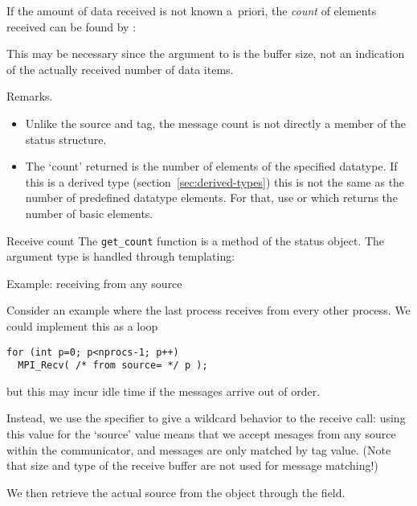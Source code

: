 If the amount of data received is not known a~priori, the
\emph{count} of elements received
can be found by 
:
%
%

This may be necessary since the  argument to  is 
the buffer size, not an indication of the actually received number of
data items.

Remarks.
\begin{itemize}
\item Unlike the source and tag, the message count is not directly a member of the status
  structure.
\item The `count' returned is the number of elements of the specified
  datatype. If this is a derived type
  (section~\ref{sec:derived-types}) this is not the same as the number
  of predefined datatype elements. For that, use
   or
  which returns the number of basic elements.
\end{itemize}

\begin{mplnote}{Receive count}
  The \lstinline+get_count+ function is a method of the status object.
  The argument type is handled through templating:
\end{mplnote}

 {Example: receiving from any source}

Consider an example where the last process receives from every other process.
We could implement this as a loop
\begin{lstlisting}
for (int p=0; p<nprocs-1; p++)
  MPI_Recv( /* from source= */ p );
\end{lstlisting}
but this may incur idle time if the messages arrive out of order.

Instead, we use the   specifier to give a wildcard
behavior to the receive call: using this value for the `source' value
means that we accept mesages from any source within the communicator,
and messages are only matched by tag value.
(Note that size and type of the receive buffer are not used for message matching!)

We then retrieve the
actual source from the  object through the
 field.
%
%

